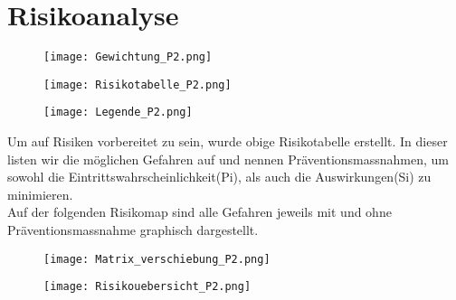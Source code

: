 \section{Risikoanalyse}
\begin{figure}[H]
	\centering
	\texttt{[image: Gewichtung\_P2.png]}
	\label{fig:Gewichtung}
\end{figure}

\newpage



\begin{figure}[H]
\centering
\texttt{[image: Risikotabelle\_P2.png]}
\label{fig:Risikotabell}
\end{figure}

\newpage
\begin{figure}[H]
	\centering
	\texttt{[image: Legende\_P2.png]}
	\label{fig:Tabelle}
\end{figure}
Um auf Risiken vorbereitet zu sein, wurde obige Risikotabelle erstellt. In dieser listen wir die möglichen Gefahren auf und nennen Präventionsmassnahmen, um sowohl die Eintrittswahrscheinlichkeit(Pi), als auch die Auswirkungen(Si) zu minimieren.\\




Auf der folgenden Risikomap sind alle Gefahren jeweils mit und ohne Präventionsmassnahme graphisch dargestellt.

\begin{figure}[H]
	\centering
	\texttt{[image: Matrix\_verschiebung\_P2.png]}
	\label{fig:Matrix_verschiebung}
\end{figure}


\begin{figure}[H]
	\centering
	\texttt{[image: Risikouebersicht\_P2.png]}
	\label{fig:Risikoüebersicht}
\end{figure}
